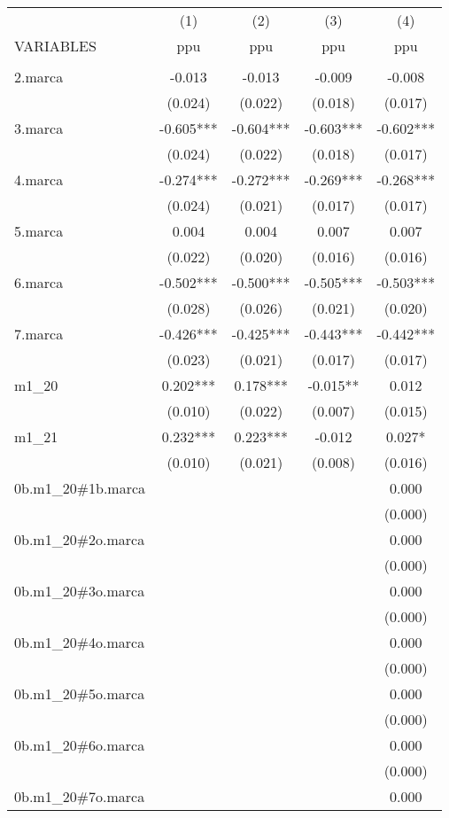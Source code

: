 \begin{tabular}{lcccc} \hline
 & (1) & (2) & (3) & (4) \\
VARIABLES & ppu & ppu & ppu & ppu \\ \hline
 &  &  &  &  \\
2.marca & -0.013 & -0.013 & -0.009 & -0.008 \\
 & (0.024) & (0.022) & (0.018) & (0.017) \\
3.marca & -0.605*** & -0.604*** & -0.603*** & -0.602*** \\
 & (0.024) & (0.022) & (0.018) & (0.017) \\
4.marca & -0.274*** & -0.272*** & -0.269*** & -0.268*** \\
 & (0.024) & (0.021) & (0.017) & (0.017) \\
5.marca & 0.004 & 0.004 & 0.007 & 0.007 \\
 & (0.022) & (0.020) & (0.016) & (0.016) \\
6.marca & -0.502*** & -0.500*** & -0.505*** & -0.503*** \\
 & (0.028) & (0.026) & (0.021) & (0.020) \\
7.marca & -0.426*** & -0.425*** & -0.443*** & -0.442*** \\
 & (0.023) & (0.021) & (0.017) & (0.017) \\
m1\_20 & 0.202*** & 0.178*** & -0.015** & 0.012 \\
 & (0.010) & (0.022) & (0.007) & (0.015) \\
m1\_21 & 0.232*** & 0.223*** & -0.012 & 0.027* \\
 & (0.010) & (0.021) & (0.008) & (0.016) \\
0b.m1\_20\#1b.marca &  &  &  & 0.000 \\
 &  &  &  & (0.000) \\
0b.m1\_20\#2o.marca &  &  &  & 0.000 \\
 &  &  &  & (0.000) \\
0b.m1\_20\#3o.marca &  &  &  & 0.000 \\
 &  &  &  & (0.000) \\
0b.m1\_20\#4o.marca &  &  &  & 0.000 \\
 &  &  &  & (0.000) \\
0b.m1\_20\#5o.marca &  &  &  & 0.000 \\
 &  &  &  & (0.000) \\
0b.m1\_20\#6o.marca &  &  &  & 0.000 \\
 &  &  &  & (0.000) \\
0b.m1\_20\#7o.marca &  &  &  & 0.000 \\

\end{tabular}
